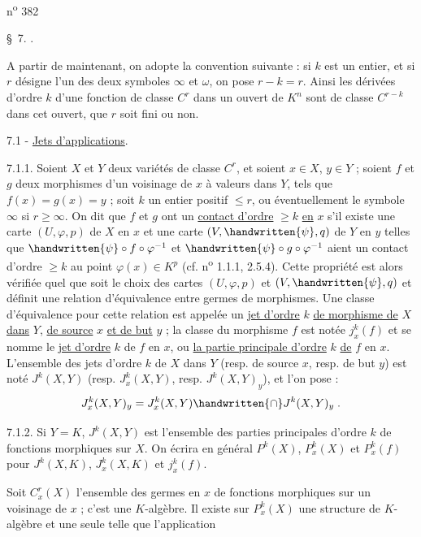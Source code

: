 \hfill n\textsuperscript{o} 382

\S\ 7. .

A partir de maintenant, on adopte la convention suivante : si $k$ est un entier, et si $r$ désigne l'un des deux symboles $\infty$ et $\omega$, on pose $r-k=r$. Ainsi les dérivées d'ordre $k$ d'une fonction de classe $C^r$ dans un ouvert de $K^n$ sont de classe $C^{r-k}$ dans cet ouvert, que $r$ soit fini ou non.

7.1 - \uline{Jets d'applications}.

7.1.1. Soient $X$ et $Y$ deux variétés de classe $C^r$, et soient $x\in X$, $y\in Y$ ; soient $f$ et $g$ deux morphismes d'un voisinage de $x$ à valeurs dans $Y$, tels que $f(x)=g(x)=y$ ; soit $k$ un entier positif $\leq r$, ou éventuellement le symbole $\infty$ si $r\geq\infty$. On dit que $f$ et $g$ ont un \uline{contact d'ordre} $\geq k$ \uline{en} $x$ s'il existe une carte $(U,\varphi,p)$ de $X$ en $x$ et une carte $(V,\handwritten{\psi},q)$ de $Y$ en $y$ telles que $\handwritten{\psi}\circ f\circ\varphi^{-1}$ et $\handwritten{\psi}\circ g\circ\varphi^{-1}$ aient un contact d'ordre $\geq k$ au point $\varphi(x)\in K^p$ (cf. n\textsuperscript{o} 1.1.1, 2.5.4). Cette propriété est alors vérifiée quel que soit le choix des cartes $(U,\varphi,p)$ et $(V,\handwritten{\psi},q)$ et définit une relation d'équivalence entre germes de morphismes. Une classe d'équivalence pour cette relation est appelée un \uline{jet d'ordre} $k$ \uline{de morphisme de} $X$ \uline{dans} $Y$, \uline{de source} $x$ \uline{et de but} $y$ ; la classe du morphisme $f$ est notée $j^k_x(f)$ et se nomme le \uline{jet d'ordre} $k$ de $f$ en $x$, ou \uline{la partie principale d'ordre} $k$ \uline{de} $f$ en $x$. L'ensemble des jets d'ordre $k$ de $X$ dans $Y$ (resp. de source $x$,  resp. de but $y$) est noté $J^k(X,Y)$ (resp. $J^k_x(X,Y)$, resp. $J^k(X,Y)_y$), et l'on pose :
\[
J^k_x(X,Y)_y=J^k_x(X,Y)\handwritten{\cap}J^k(X,Y)_y\;.
\]

7.1.2. Si $Y=K$, $J^k(X,Y)$ est l'ensemble des parties principales d'ordre $k$ de fonctions morphiques sur $X$. On écrira en général $P^k(X)$, $P^k_x(X)$ et $P^k_x(f)$ pour $J^k(X,K)$, $J^k_x(X,K)$ et $j^k_x(f)$.

Soit $C^r_x(X)$ l'ensemble des germes en $x$ de fonctions morphiques sur un voisinage de $x$ ; c'est une $K$-algèbre. Il existe sur $P^k_x(X)$ une structure de $K$-algèbre et une seule telle que l'application
